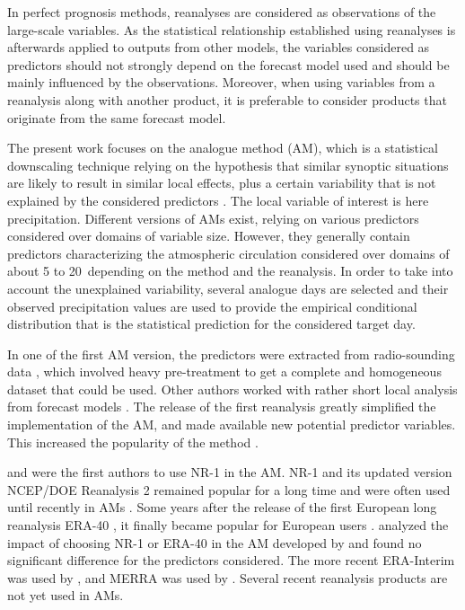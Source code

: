 \documentclass{ametsoc}
\begin{document}
In perfect prognosis methods, reanalyses are considered as observations of the large-scale variables. As the statistical relationship established using reanalyses is afterwards applied to outputs from other models, the variables considered as predictors should not strongly depend on the forecast model used and should be mainly influenced by the observations. Moreover, when using variables from a reanalysis along with another product, it is preferable to consider products that originate from the same forecast model.

The present work focuses on the analogue method (AM), which is a statistical downscaling technique relying on the hypothesis that similar synoptic situations are likely to result in similar local effects, plus a certain variability that is not explained by the considered predictors \citep{Lorenz1969}. The local variable of interest is here precipitation. Different versions of AMs exist, relying on various predictors considered over domains of variable size. However, they generally contain predictors characterizing the atmospheric circulation considered over domains of about 5 to 20\degree\ depending on the method and the reanalysis. In order to take into account the unexplained variability, several analogue days are selected and their observed precipitation values are used to provide the empirical conditional distribution that is the statistical prediction for the considered target day.

In one of the first AM version, the predictors were extracted from radio-sounding data \citep{Duband1981}, which involved heavy pre-treatment to get a complete and homogeneous dataset that could be used. Other authors worked with rather short local analysis from forecast models \cite[for example][]{Kruizinga1983, VandenDool1989}. The release of the first reanalysis \citep[NCEP/NCAR Reanalysis I, NR-1 --][]{Kalnay1996, Kistler2001} greatly simplified the implementation of the AM, and made available new potential predictor variables. This increased the popularity of the method \citep{Timbal2008a}.

\citet{Timbal2003} and \citet{Bontron2004} were the first authors to use NR-1 in the AM. NR-1 and its updated version NCEP/DOE Reanalysis 2 \citep[NR-2 --][]{Kanamitsu2002} remained popular for a long time and were often used until recently in AMs \citep{Wetterhall2005a, Gangopadhyay2005, Altava-Ortiz2006, Barrera2007, Cannon2007, Matulla2007, Bliefernicht2007, Maurer2008, Wu2012, Marty2012, Teng2012, Horton2012, Yiou2014}. Some years after the release of the first European long reanalysis ERA-40 \citep{Uppala2005}, it finally became popular for European users \citep {Willems2011b, JakobThemessl2011a, BenDaoud2011, Turco2011a, Franke2011, Pascual2012b, Schenk2012, Ribalaygua2013a, Osca2013, Radanovics2013, Martin2014b, Chardon2014, BenDaoud2016}. \citet{BenDaoud2009} analyzed the impact of choosing NR-1 or ERA-40 in the AM developed by \citet{Bontron2004} and found no significant difference for the predictors considered. The more recent ERA-Interim \citep[ERA-INT, ][]{Dee2011a} was used by \cite{Raynaud2016b}, and MERRA \citep{Rienecker2011} was used by \citet{Vanvyve2015}. Several recent reanalysis products are not yet used in AMs.
\end{document}
